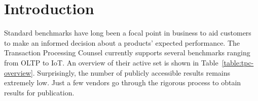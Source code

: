 \documentclass{cidr-2019}
\begin{document}
\maketitle

\section{Introduction}\label{Introduction}


Standard benchmarks have long been a focal point in business to aid customers to make an informed
decision about a products' expected performance. The Transaction
Processing Counsel currently supports several benchmarks ranging
from OLTP to IoT. An overview of their active set is 
shown in Table~\ref{table:tpc-overview}. Surprisingly, the number of publicly
accessible results remains extremely low. Just a few vendors go through the rigorous
process to obtain results for publication. 

\end{document}
